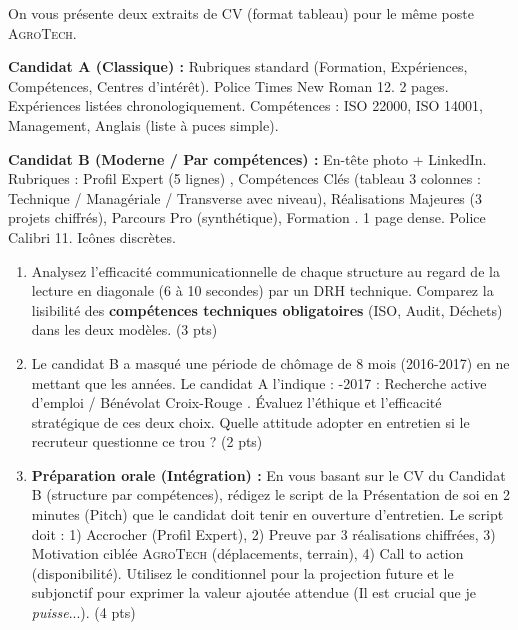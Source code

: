 \documentclass[11pt]{article}
\begin{document}
\begin{exercice}
On vous présente deux extraits de CV (format tableau) pour le même poste \textsc{AgroTech}.

\textbf{Candidat A (Classique) :} Rubriques standard (Formation, Expériences, Compétences, Centres d'intérêt). Police Times New Roman 12. 2 pages. Expériences listées chronologiquement. Compétences : \og ISO 22000, ISO 14001, Management, Anglais \fg{} (liste à puces simple).

\textbf{Candidat B (Moderne / Par compétences) :} En-tête photo + LinkedIn. Rubriques : \og Profil Expert (5 lignes) \fg{}, \og Compétences Clés \fg{} (tableau 3 colonnes : Technique / Managériale / Transverse avec niveau), \og Réalisations Majeures \fg{} (3 projets chiffrés), \og Parcours Pro \fg{} (synthétique), \og Formation \fg{}. 1 page dense. Police Calibri 11. Icônes discrètes.

\begin{enumerate}
    \item Analysez l'efficacité communicationnelle de chaque structure au regard de la lecture \og en diagonale \fg{} (6 à 10 secondes) par un DRH technique. Comparez la lisibilité des \textbf{compétences techniques obligatoires} (ISO, Audit, Déchets) dans les deux modèles. (3 pts)
    \item Le candidat B a masqué une période de chômage de 8 mois (2016-2017) en ne mettant que les années. Le candidat A l'indique : -2017 : Recherche active d'emploi / Bénévolat Croix-Rouge \fg{}. Évaluez l'éthique et l'efficacité stratégique de ces deux choix. Quelle attitude adopter en entretien si le recruteur questionne ce trou ? (2 pts)
    \item \textbf{Préparation orale (Intégration) :} En vous basant sur le CV du Candidat B (structure par compétences), rédigez le script de la \og Présentation de soi en 2 minutes \fg{} (Pitch) que le candidat doit tenir en ouverture d'entretien. Le script doit : 1) Accrocher (Profil Expert), 2) Preuve par 3 réalisations chiffrées, 3) Motivation ciblée \textsc{AgroTech} (déplacements, terrain), 4) Call to action (disponibilité). Utilisez le conditionnel pour la projection future et le subjonctif pour exprimer la valeur ajoutée attendue (\og Il est crucial que je \textit{puisse}...\fg{}). (4 pts)
\end{enumerate}
\end{exercice}
\end{document}
